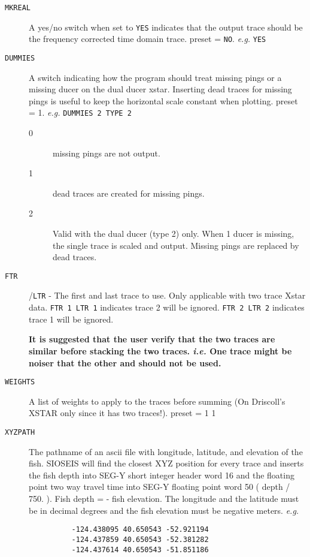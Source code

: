 \begin{description}
\item[\texttt{MKREAL}] A yes/no switch when set to \texttt{YES} indicates that the output
          trace should be the frequency corrected time domain trace.
          \Gls{preset} = \texttt{NO}.       \textit{e.g.} \texttt{YES}

\item[\texttt{DUMMIES}] A switch indicating how the program should treat missing
          pings or a missing ducer on the dual ducer xstar.
          Inserting dead traces for missing pings is useful to keep
          the horizontal scale constant when plotting.
          \Gls{preset} = 1.        \textit{e.g.} \texttt{DUMMIES 2 TYPE 2}
\begin{description}
    \item[0] missing pings are not output.
    \item[1] dead traces are created for missing pings.
    \item[2] Valid with the dual ducer (type 2) only.  When 1 ducer
          is missing, the single trace is scaled and output.  Missing
          pings are replaced by dead traces.
\end{description}

\item[\texttt{FTR}] /\texttt{LTR} - The first and last trace to use.  Only applicable with two
          trace Xstar data.  \texttt{FTR 1 LTR 1} indicates trace 2 will be
          ignored.  \texttt{FTR 2 LTR 2} indicates trace 1 will be ignored.

\textbf{It is suggested that the user verify that the two traces are similar
        before stacking the two traces.  \textit{i.e.} One trace might be
        noiser that the other and should not be used.}

\item[\texttt{WEIGHTS}] A list of weights to apply to the traces before summing
          (On Driscoll's XSTAR only since it has two traces!).
          \Gls{preset} = 1 1

\item[\texttt{XYZPATH}] The pathname of an \gls{ascii} file with longitude,
          latitude, and elevation of the fish.  SIOSEIS will
          find the closest XYZ position for every trace and
          inserts the fish depth into SEG-Y short integer header
          word 16 and the floating point two way travel time
          into SEG-Y floating point word 50 ( depth / 750. ).
          Fish depth = - fish elevation.  The longitude and
          the latitude must be in decimal degrees and the fish
          elevation must be negative meters.  \textit{e.g.}
\begin{verbatim}
          -124.438095 40.650543 -52.921194
          -124.437859 40.650543 -52.381282
          -124.437614 40.650543 -51.851186
\end{verbatim}


\end{description}

